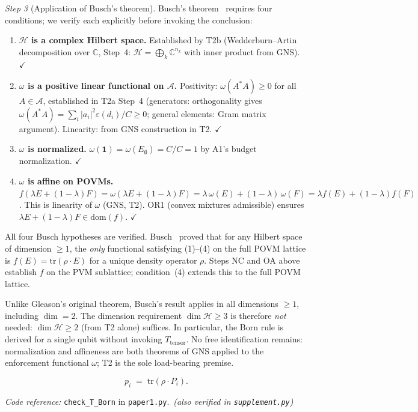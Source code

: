 \documentclass[11pt]{article}
\theoremstyle{remark}
\newcommand{\coderef}[2]{\smallskip\noindent\textit{Code reference:} \texttt{#1} in \texttt{#2}.}
\begin{document}
\begin{tcolorbox}[apfbox, title={$T_{\mathrm{Born}}$: Born Rule from Admissibility Invariance}]
\textit{Step 3} (Application of Busch's theorem).  Busch's theorem~\cite{Busch2003} requires four conditions; we verify each explicitly before invoking the conclusion:
\begin{enumerate}[nosep,leftmargin=2em,itemsep=2pt]
  \item \textbf{$\mathcal{H}$ is a complex Hilbert space.}  Established by T2b (Wedderburn--Artin decomposition over $\mathbb{C}$, Step~4: $\mathcal{H} = \bigoplus_k \mathbb{C}^{n_k}$ with inner product from GNS).  $\checkmark$
  \item \textbf{$\omega$ is a positive linear functional on $\mathcal{A}$.}  Positivity: $\omega(A^*A) \ge 0$ for all $A \in \mathcal{A}$, established in T2a Step~4 (generators: orthogonality gives $\omega(A^*A) = \sum_i |a_i|^2 \varepsilon(d_i)/C \ge 0$; general elements: Gram matrix argument).  Linearity: from GNS construction in T2.  $\checkmark$
  \item \textbf{$\omega$ is normalized.}  $\omega(\mathbf{1}) = \omega(E_\emptyset) = C/C = 1$ by A1's budget normalization.  $\checkmark$
  \item \textbf{$\omega$ is affine on POVMs.}  $f(\lambda E + (1{-}\lambda)F) = \omega(\lambda E + (1{-}\lambda)F) = \lambda\,\omega(E) + (1{-}\lambda)\,\omega(F) = \lambda f(E) + (1{-}\lambda)f(F)$.  This is linearity of $\omega$ (GNS, T2).  OR1 (convex mixtures admissible) ensures $\lambda E + (1{-}\lambda)F \in \mathrm{dom}(f)$.  $\checkmark$
\end{enumerate}
All four Busch hypotheses are verified.  Busch~\cite{Busch2003} proved that for any Hilbert space of dimension $\ge 1$, the \emph{only} functional satisfying (1)--(4) on the full POVM lattice is $f(E) = \mathrm{tr}(\rho \cdot E)$ for a unique density operator $\rho$.  Steps NC and OA above establish $f$ on the PVM sublattice; condition~(4) extends this to the full POVM lattice.

Unlike Gleason's original theorem, Busch's result applies in all dimensions $\ge 1$, including $\dim = 2$.  The dimension requirement $\dim \mathcal{H} \ge 3$ is therefore \emph{not} needed: $\dim \mathcal{H} \ge 2$ (from T2 alone) suffices.  In particular, the Born rule is derived for a single qubit without invoking $T_{\mathrm{tensor}}$.  No free identification remains: normalization and affineness are both theorems of GNS applied to the enforcement functional $\omega$; T2 is the sole load-bearing premise.

\begin{equation}
p_i \;=\; \mathrm{tr}(\rho \cdot P_i).
\end{equation}

\coderef{check\_T\_Born}{paper1.py}\,%
\hspace{1em}\textit{(also verified in \texttt{supplement.py})}
\end{tcolorbox}
\end{document}
